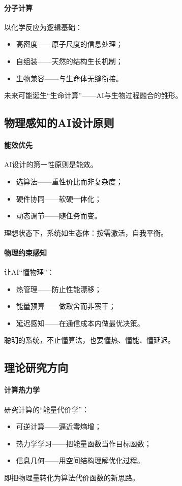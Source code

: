 \paragraph{分子计算}
以化学反应为逻辑基础：
\begin{itemize}
\item 高密度——原子尺度的信息处理；
\item 自组装——天然的结构生长机制；
\item 生物兼容——与生命体无缝衔接。
\end{itemize}
未来可能诞生“生命计算”——AI与生物过程融合的雏形。

\subsection{物理感知的AI设计原则}

\paragraph{能效优先}
AI设计的第一性原则是能效。  
\begin{itemize}
\item 选算法——重性价比而非复杂度；
\item 硬件协同——软硬一体化；
\item 动态调节——随任务而变。
\end{itemize}
理想状态下，系统如生态体：按需激活，自我平衡。

\paragraph{物理约束感知}
让AI“懂物理”：
\begin{itemize}
\item 热管理——防止性能漂移；
\item 能量预算——做取舍而非蛮干；
\item 延迟感知——在通信成本内做最优决策。
\end{itemize}
聪明的系统，不止懂算法，也要懂热、懂能、懂延迟。

\subsection{理论研究方向}

\paragraph{计算热力学}
研究计算的“能量代价学”：
\begin{itemize}
\item 可逆计算——逼近零熵增；
\item 热力学学习——把能量函数当作目标函数；
\item 信息几何——用空间结构理解优化过程。
\end{itemize}
即把物理量转化为算法代价函数的新思路。

